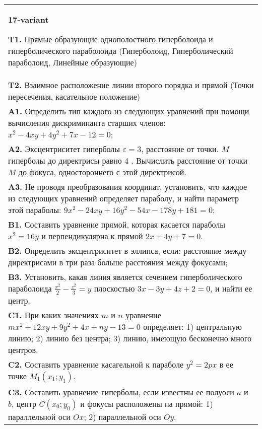 \documentclass{article}
\begin{document}
\begin{tabular}{m{17cm}}
\textbf{17-variant}
\newline

\textbf{T1.} Прямые образующие однополостного гиперболоида и гиперболического параболоида (Гиперболоид, Гиперболический параболоид, Линейные образующие) \\
\textbf{T2.} Взаимное расположение линии второго порядка и прямой (Точки пересечения, касательное положение) \\
\textbf{A1.} Определить тип каждого из следующих уравнений при помощи вычисления дискриминанта старших членов: $x^2-4 x y+4 y^2+7 x-12=0$; \\
\textbf{A2.} Эксцентриситет гиперболы $\varepsilon=3$, расстояние от точки. $M$ гиперболы до директрисы равно 4 . Вычислить расстояние от точки $M$ до фокуса, одностороннего с этой директрисой. \\
\textbf{A3.} Не проводя преобразования координат, установить, что каждое из следующих уравнений определяет параболу, и найти параметр этой параболы: $9 x^2-24 x y+16 y^2-54 x-178 y+181=0$; \\
\textbf{B1.} Составить уравнение прямой, которая касается параболы $x^2=16 y$ и перпендикулярна к прямой $2 x+4 y+7=0$. \\
\textbf{B2.} Определить эксцентриситет в эллипса, если: расстояние между директрисами в три раза больше расстояния между фокусами; \\
\textbf{B3.} Установить, какая линия является сечением гиперболического параболоида $\frac{x^2}{2}-\frac{z^2}{3}=y$ плоскостью $3 x-3 y+4 z+2=0$, и найти ее центр. \\
\textbf{C1.} При каких значениях $m$ и $n$ уравнение $m x^2+12 x y+9 y^2+4 x+n y-13=0$ определяет: 1) центральную линию; 2) линию без центра; 3) линию, имеющую бесконечно много центров. \\
\textbf{C2.} Составить уравнение касагельной к параболе $y^2=2 p x$ в ее точке $M_1\left(x_1 ; y_1\right)$. \\
\textbf{C3.} Составить уравнение гиперболы, если известны ее полуоси $a$ и $b$, центр $C\left(x_0 ; y_0\right)$ и фокусы расположены на прямой: 1) параллельной оси $O x$; 2) параллельной оси $O y$. \\

\end{tabular}
\vspace{1cm}
\end{document}
